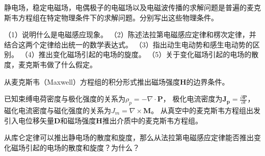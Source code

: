 \begin{question} 
静电场，稳定电磁场，电偶极子的电磁场以及电磁波传播的求解问题是普遍的麦克斯韦方程组在特定物理条件下的求解问题。分别写出这些物理条件。
\end{question}

\begin{question} 
（1）说明什么是电磁感应现象。
（2）陈述法拉第电磁感应定律和楞次定律，并结合这两个定律给出统一的数学表达式。
（3）指出动生电动势和感生电动势的区别。
（4）推出变化磁场引起的电场的旋度。
（5）关于变化磁场引起的电场的散度，麦克斯韦做了什么假定。
\end{question}

\begin{question} 
从麦克斯韦（Maxwell）方程组的积分形式推出磁场强度$\mathbf{H}$的边界条件。
\end{question}

\begin{question} 
已知束缚电荷密度与极化强度的关系为$\rho_p=-\nabla \cdot \mathbf{P}$，
极化电流密度为$\mathbf{J_p}=\frac{\partial \mathbf{P}}{\partial t}$，
磁化电流密度与磁化强度的关系为$J_m=\nabla \times \mathbf{M}$。
从真空中的麦克斯韦方程组出发引入电位移矢量$\mathbf{D}$和磁场强度$\mathbf{H}$推出介质中的麦克斯韦方程组。
\end{question}

\begin{question} 
从库仑定律可以推出静电场的散度和旋度，那么从法拉第电磁感应定律能否推出变化磁场引起的电场的散度和旋度？为什么？
\end{question}